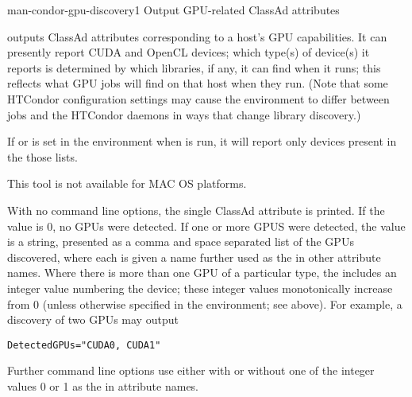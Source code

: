 \begin{ManPage}{}{man-condor-gpu-discovery}{1}
{Output GPU-related ClassAd attributes}

\Synopsis {}


\Description

 outputs ClassAd attributes corresponding to a
host's GPU capabilities.  It can presently report CUDA and OpenCL
devices; which type(s) of device(s) it reports is determined by which
libraries, if any, it can find when it runs; this reflects what GPU jobs
will find on that host when they run.  (Note that some HTCondor
configuration settings may cause the environment to differ between jobs
and the HTCondor daemons in ways that change library discovery.)

If  or  is set
in the environment when  is run, it will report
only devices present in the those lists.

This tool is not available for MAC OS platforms.

With no command line options, the single ClassAd attribute
 is printed.
If the value is 0, no GPUs were detected.
If one or more GPUS were detected, the value is
a string, presented as a comma and space separated list of the GPUs discovered,
where each is given a name further used as the  in other
attribute names.
Where there is more than one GPU of a particular type,
the  includes an integer value numbering the device;
these integer values monotonically increase from 0 (unless otherwise
specified in the environment; see above).
For example, a discovery of two GPUs may output
\begin{verbatim}
DetectedGPUs="CUDA0, CUDA1"
\end{verbatim}
Further command line options use  either with or without one of
the integer values 0 or 1 as the  in
attribute names.


\end{ManPage}
